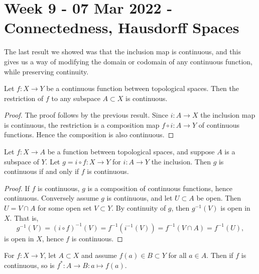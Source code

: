 \section{Week 9 - 07 Mar 2022 - Connectedness, Hausdorff Spaces }
The last result we showed was that the inclusion map is continuous, and this
gives us a way of modifying the domain or codomain of any continuous function,
while preserving continuity.
\begin{lemma}
  Let $f:X\to Y$ be a continuous function between topological spaces. Then the
  restriction of $f$ to any subspace $A\subset X$ is continuous.
  \label{lem:restrictFunContinuous}
\end{lemma}
\begin{proof}
  The proof follows by the previous result. Since $i:A\to X$ the inclusion map
  is continuous, the restriction is a composition map $f\circ i:A\to Y$ of
  continuous functions. Hence the composition is also continuous.
\end{proof}
\begin{lemma}
  Let $f:X\to A$ be a function between topological spaces, and suppose $A$ is a
  subspace of $Y$. Let $g=i\circ f: X\to Y$ for $i:A\to Y$ the inclusion. Then
  $g$ is continuous if and only if $f$ is continuous.
  \label{<+label+>}
\end{lemma}
\begin{proof}
  If $f$ is continuous, $g$ is a composition of continuous functions, hence
  continuous. Conversely assume $g$ is continuous, and let $U\subset A$ be open.
  Then $U=V\cap A$ for some open set $V\subset Y$. By continuity of $g$, then
  $g^{-1}(V)$ is open in $X$. That is,
  \[g^{-1}(V)= (i\circ f)^{-1}(V) = f^{-1}(i^{-1}(V))= f^{-1}(V\cap
  A)=f^{-1}(U),\]
  is open in $X$, hence $f$ is continuous.
\end{proof}
\begin{remark}
  For $f:X\to Y$, let $A\subset X$ and assume $f(a)\in B\subset Y$ for all $a\in
  A$. Then if $f$ is continuous, so is $f^*:A\to B: a\mapsto f(a)$.
  \label{<+label+>}
\end{remark}

